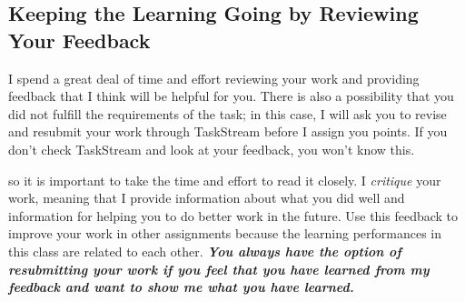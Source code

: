 \documentclass{tufte-handout}
\begin{document}

\subsection{Keeping the Learning Going by Reviewing Your Feedback}
I spend a great deal of time and effort reviewing your work and providing feedback that I think will be helpful for you. There is also a possibility that you did not fulfill the requirements of the task; in this case, I will ask you to revise and resubmit your work through TaskStream before I assign you points. If you don't check TaskStream and look at your feedback, you won't know this.

 so it is important to take the time and effort to read it closely. I \emph{critique} your work, meaning that I provide information about what you did well and information for helping you to do better work in the future. Use this feedback to improve your work in other assignments because the learning performances in this class are related to each other. \textbf{\emph{You always have the option of resubmitting your work if you feel that you have learned from my feedback and want to show me what you have learned.}}

\newpage
\end{document}
